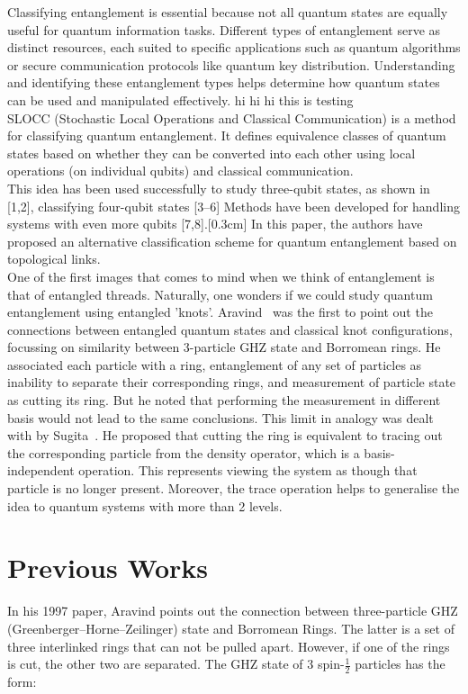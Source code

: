 \documentclass{scrartcl}
\begin{document}
Classifying entanglement is essential because not all quantum states are equally useful for quantum information tasks. Different types of entanglement serve as distinct resources, each suited to specific applications such as quantum algorithms or secure communication protocols like quantum key distribution. Understanding and identifying these entanglement types helps determine how quantum states can be used and manipulated effectively. hi hi hi this is testing\\[0.3cm]
SLOCC (Stochastic Local Operations and Classical Communication) is a method for classifying quantum entanglement. It defines equivalence classes of quantum states based on whether they can be converted into each other using local operations (on individual qubits) and classical communication.\\[0.3cm]
This idea has been used successfully to study three-qubit states, as shown in [1,2], classifying four-qubit states [3–6] Methods have been developed for handling systems with even more qubits [7,8].[0.3cm]
In this paper, the authors have proposed an alternative classification scheme for quantum entanglement based on topological links.\\[0.3cm]
One of the first images that comes to mind when we think of entanglement is that of entangled threads. Naturally, one wonders if we could study quantum entanglement using entangled 'knots'. Aravind~\cite{Aravind1997} was the first to point out the connections between entangled quantum states and classical knot configurations, focussing on similarity between 3-particle GHZ state and Borromean rings. He associated each particle with a ring, entanglement of any set of particles as inability to separate their corresponding rings, and measurement of particle state as cutting its ring. But he noted that performing the measurement in different basis would not lead to the same conclusions. This limit in analogy was dealt with by Sugita~\cite{Sugita2007-ko}. He proposed that cutting the ring is equivalent to tracing out the corresponding particle from the density operator, which is a basis-independent operation. This represents viewing the system as though that particle is no longer present. Moreover, the trace operation helps to generalise the idea to quantum systems with more than 2 levels.  

\section{Previous Works}
In his 1997 paper, Aravind points out the connection between three-particle GHZ (Greenberger–Horne–Zeilinger)
state and Borromean Rings. The latter is a set of three interlinked rings that can not be pulled apart. However, if one of the rings is cut, the other two are separated. The GHZ state of 3 spin-$\frac{1}{2}$ particles has the form:
\end{document}
